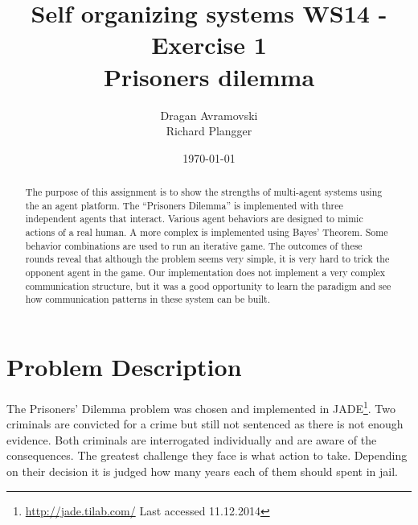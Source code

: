 \documentclass{acm_proc_article-sp}
\begin{document}
\title{Self organizing systems WS14 - Exercise 1\\
       Prisoners dilemma}%

\author{
\alignauthor
Dragan Avramovski\\
\alignauthor
Richard Plangger\\
}

\date{\today}

\maketitle

\begin{abstract}
 The purpose of this assignment is to show the strengths of multi-agent systems using the an agent platform. The ``Prisoners Dilemma'' is implemented with three independent agents that interact. Various agent behaviors are designed to mimic actions of a real human. A more complex is implemented using Bayes' Theorem. Some behavior combinations 
 are used to run an iterative game. The outcomes of these rounds reveal that although the problem seems very simple, it is very hard to trick the opponent agent in the game. Our
 implementation does not implement a very complex communication structure, but it
 was a good opportunity to learn the paradigm and see how communication patterns in
 these system can be built.
\end{abstract}



\section{Problem Description}
\label{sec:problem-desc}

The Prisoners' Dilemma problem was chosen and implemented in JADE\footnote{\url{http://jade.tilab.com/} Last accessed 11.12.2014}. Two criminals are convicted for a crime but still not sentenced as there is not enough evidence. Both criminals are interrogated individually and are aware of the consequences. The greatest challenge they face is what action to take. Depending on their decision it is judged how many
years each of them should spent in jail. 
\end{document}
